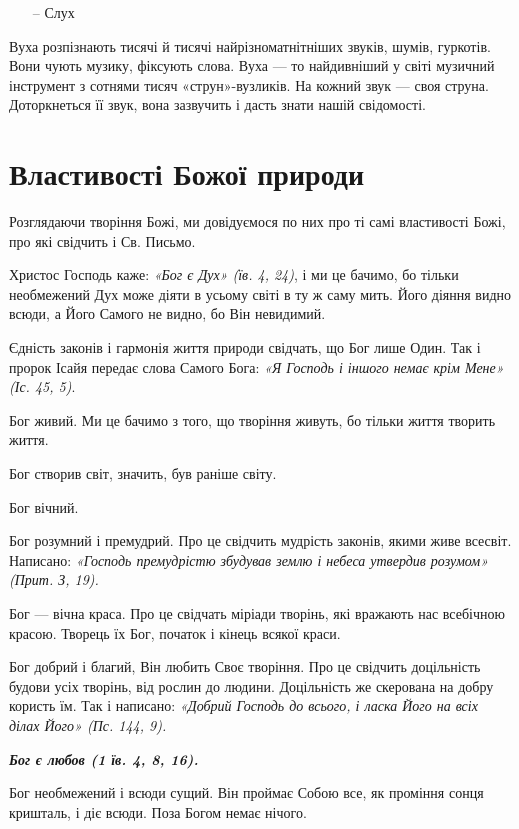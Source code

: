 \documentclass[main.tex]{subfiles}
\begin{document}
\begin{itemize}
    \item[--]{Слух}   
\end{itemize}

Вуха розпізнають тисячі й тисячі найрізноматнітніших звуків, шумів, гуркотів. Вони чують музику, фіксують слова. Вуха — то найдивніший у світі музичний інструмент з сотнями тисяч «струн»-вузликів. На кожний звук — своя струна. Доторкнеться її звук, вона зазвучить і дасть знати нашій свідомості.

\section{Властивості Божої природи}

Розглядаючи творіння Божі, ми довідуємося по них про ті самі властивості Божі, про які свідчить і Св. Письмо.

Христос Господь каже: \emph{{\color{red}«Бог є Дух»} (їв. 4, 24)}, і ми це бачимо, бо тільки необмежений Дух може діяти в усьому світі в ту ж саму мить. Його діяння видно всюди, а Його Самого не видно, бо Він невидимий.

Єдність законів і гармонія життя природи свідчать, що Бог лише Один. Так і пророк Ісайя передає слова Самого Бога: \emph{{\color{red} «Я Господь і іншого немає крім Мене»} (Іс. 45, 5)}.

Бог живий. Ми це бачимо з того, що творіння живуть, бо тільки життя творить життя.

Бог створив світ, значить, був раніше світу.

Бог вічний.

Бог розумний і премудрий. Про це свідчить мудрість законів, якими живе всесвіт. Написано: \emph{«Господь премудрістю збудував землю і небеса утвердив розумом» (Прит. З, 19).}

Бог — вічна краса. Про це свідчать міріади творінь, які вражають нас всебічною красою. Творець їх Бог, початок і кінець всякої краси.

Бог добрий і благий, Він любить Своє творіння. Про це свідчить доцільність будови усіх творінь, від рослин до людини. Доцільність же скерована на добру користь їм. Так і написано: \emph{«Добрий Господь до всього, і ласка Його на всіх ділах Його» (Пс. 144, 9).}

\textbf{\emph{Бог є любов (1 їв. 4, 8, 16).}}

Бог необмежений і всюди сущий. Він проймає Собою все, як проміння сонця кришталь, і діє всюди. Поза Богом немає нічого.
 
\end{document}
